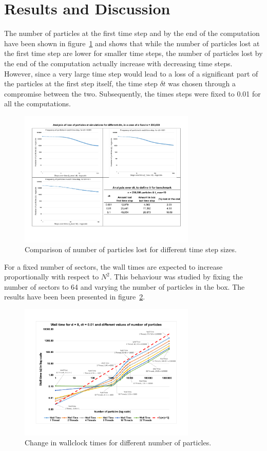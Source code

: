 \documentclass[11pt, oneside]{article}
\begin{document}
\section{Results and Discussion}
The number of particles at the first time step and by the end of the computation have been shown in figure~\ref{fig:loss} and shows that while the number of particles lost at the first time step are lower for smaller time steps, the number of particles lost by the end of the computation actually increase with decreasing time steps. However, since a very large time step would lead to a loss of a significant part of the particles at the first step itself, the time step $\delta t$ was chosen through a compromise between the two. Subsequently, the times steps were fixed to \num{0.01} for all the computations. 
	\begin{figure}[h]
		\centering
		\includegraphics[width=0.75\textwidth]{Figures/PL.pdf}
		\caption{Comparison of number of particles lost for different time step sizes.}
		\label{fig:loss}
	\end{figure}
        
        For a fixed number of sectors, the wall times are expected to increase proportionally with respect to $N^2$. This behaviour was studied by fixing the number of sectors to 64 and varying the number of particles in the box. The results have been been presented in figure~\ref{fig:N_scaling}.
        	\begin{figure}[h]
		\centering
		\includegraphics[width=0.75\textwidth]{Figures/N.pdf}
		\caption{Change in wallclock times for different number of particles.}
		\label{fig:N_scaling}
	        \end{figure}
\end{document}
